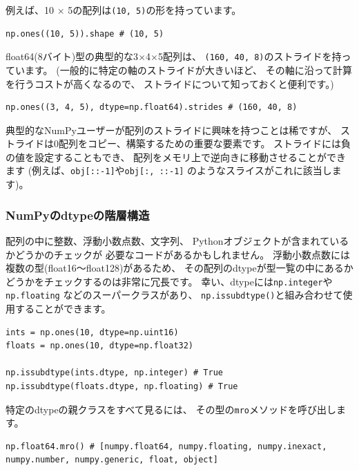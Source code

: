 \documentclass{jsarticle}
\begin{document}
        例えば、10 $\times$ 5の配列は\verb|(10, 5)|の形を持っています。

        \begin{lstlisting}
np.ones((10, 5)).shape # (10, 5)\end{lstlisting}

        float64(8バイト)型の典型的な3$\times$4$\times$5配列は、
        \verb|(160, 40, 8)|のストライドを持っています。
        (一般的に特定の軸のストライドが大きいほど、
        その軸に沿って計算を行うコストが高くなるので、
        ストライドについて知っておくと便利です。)

        \begin{lstlisting}
np.ones((3, 4, 5), dtype=np.float64).strides # (160, 40, 8)\end{lstlisting}

        典型的なNumPyユーザーが配列のストライドに興味を持つことは稀ですが、
        ストライドは0配列をコピー、構築するための重要な要素です。
        ストライドには負の値を設定することもでき、
        配列をメモリ上で逆向きに移動させることができます
        (例えば、\verb|obj[::-1]|や\verb|obj[:, ::-1]|
        のようなスライスがこれに該当します)。

        \subsubsection*{NumPyのdtypeの階層構造}
            配列の中に整数、浮動小数点数、文字列、
            Pythonオブジェクトが含まれているかどうかのチェックが
            必要なコードがあるかもしれません。
            浮動小数点数には複数の型(float16～float128)があるため、
            その配列のdtypeが型一覧の中にあるかどうかをチェックするのは非常に冗長です。
            幸い、dtypeには\verb|np.integer|や\verb|np.floating|
            などのスーパークラスがあり、
            \verb|np.issubdtype()|と組み合わせて使用することができます。

            \begin{lstlisting}
ints = np.ones(10, dtype=np.uint16)
floats = np.ones(10, dtype=np.float32)

np.issubdtype(ints.dtype, np.integer) # True
np.issubdtype(floats.dtype, np.floating) # True\end{lstlisting}

            特定のdtypeの親クラスをすべて見るには、
            その型の\verb|mro|メソッドを呼び出します。

            \begin{lstlisting}
np.float64.mro() # [numpy.float64, numpy.floating, numpy.inexact, numpy.number, numpy.generic, float, object]\end{lstlisting}
\end{document}
